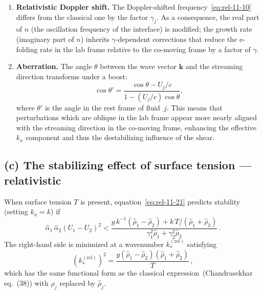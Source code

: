 \begin{enumerate}
\item \textbf{Relativistic Doppler shift.}  The Doppler-shifted
frequency~\eqref{eq:rel-11-10} differs from the classical one by the
factor $\gamma_j$. As a consequence, the real part of $n$ (the
oscillation frequency of the interface) is modified; the growth rate
(imaginary part of $n$) inherits $\gamma$-dependent corrections that
reduce the e-folding rate in the lab frame relative to the co-moving
frame by a factor of $\gamma$.

\item \textbf{Aberration.}  The angle $\theta$ between the wave vector
$\mathbf{k}$ and the streaming direction transforms under a boost:
\begin{equation}\label{eq:rel-11-26}
  \cos\theta' = \frac{\cos\theta - U_j/c}{1 - (U_j/c)\cos\theta},
\end{equation}
where $\theta'$ is the angle in the rest frame of fluid~$j$.
This means that perturbations which are oblique in the lab frame appear
more nearly aligned with the streaming direction in the co-moving frame,
enhancing the effective $k_x$ component and thus the destabilizing
influence of the shear.
\end{enumerate}

\subsection*{(c) The stabilizing effect of surface tension — relativistic}

When surface tension $T$ is present, equation~\eqref{eq:rel-11-21}
predicts stability (setting $k_x = k$) if
\begin{equation}\label{eq:rel-11-27}
  \hat{\alpha}_1\,\hat{\alpha}_2\!\left(U_1 - U_2\right)^{2}
  < \frac{g\,k^{-1}\!\left(\hat{\rho}_1 - \hat{\rho}_2\right)
  + k\, T/(\hat{\rho}_1 + \hat{\rho}_2)}
  {\gamma_1^{2}\hat{\rho}_1 + \gamma_2^{2}\hat{\rho}_2}\,.
\end{equation}
The right-hand side is minimized at a wavenumber $k_*^{(\mathrm{rel})}$
satisfying
\begin{equation}\label{eq:rel-11-28}
  \left(k_*^{(\mathrm{rel})}\right)^{2}
  = \frac{g\!\left(\hat{\rho}_1 - \hat{\rho}_2\right)
  (\hat{\rho}_1 + \hat{\rho}_2)}{T}\,,
\end{equation}
which has the same functional form as the classical
expression~(Chandrasekhar eq.~(38)) with $\rho_j$ replaced by
$\hat{\rho}_j$.

